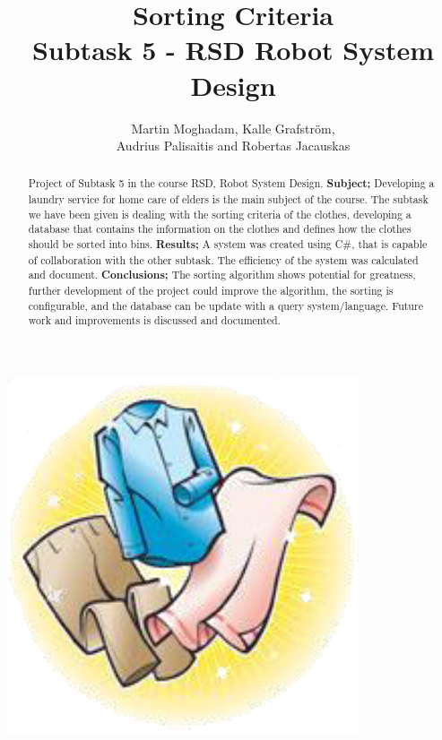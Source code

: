 \documentclass[a4paper, 11pt]{article}	%
\begin{document}
\begin{titlepage}
\title{\Huge \bfseries Sorting Criteria \vspace{3 mm}\\ \Large \normalfont Subtask 5 - RSD Robot System Design\vspace{10mm}}   %
\author{Martin Moghadam, Kalle Grafstr\"{o}m, \\ Audrius Palisaitis and Robertas Jacauskas}         %
\maketitle

\begin{center}
\includegraphics[scale=0.4]{frontPage}
\end{center}

\begin{abstract}
\noindent Project of Subtask 5 in the course RSD, Robot System Design. \textbf{Subject;} Developing a laundry service for home care of elders is the main subject of the course. The subtask we have been given is dealing with the sorting criteria of the clothes, developing a database that contains the information on the clothes and defines how the clothes should be sorted into bins. \textbf{Results;} A system was created using C\#, that is capable of collaboration with the other subtask. The efficiency of the system was calculated and document. \textbf{Conclusions;} The sorting algorithm shows potential for greatness, further development of the project could improve the algorithm, the sorting is configurable, and the database can be update with a query system/language. Future work and improvements is discussed and documented.
\end{abstract}

\end{titlepage}
\end{document}
